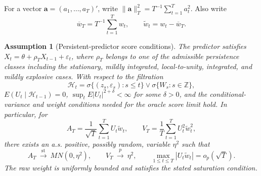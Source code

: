 \documentclass{article}
\newtheorem{assumption}{Assumption}
\begin{document}
For a vector \(\bm a=(a_1,\ldots,a_T)'\), write
\(\|\bm a\|_T^2=T^{-1}\sum_{t=1}^T a_t^2\).  Also write
\[
    \overline w_T=T^{-1}\sum_{t=1}^T w_t,
    \qquad
    \widetilde w_t=w_t-\overline w_T.
\]

\begin{assumption}[Persistent-predictor score conditions]
\label{ass:score-core}
The predictor satisfies
\(X_t=\theta+\rho_T X_{t-1}+\varepsilon_t\), where \(\rho_T\) belongs to
one of the admissible persistence classes
including the stationary, mildly integrated, local-to-unity,
integrated, and mildly explosive cases.  With respect to the filtration
\[
    \mathcal H_t
    =\sigma\{(z_s,\varepsilon_s):s\leq t\}
       \vee\sigma\{W_s:s\in\mathbb Z\},
\]
\(E(U_t\mid\mathcal H_{t-1})=0\),
\(\sup_tE|U_t|^{2+\delta}<\infty\) for some \(\delta>0\), and the
conditional-variance and weight conditions needed for the oracle score limit
hold.  In particular, for
\[
    A_T=\frac1{\sqrt T}\sum_{t=1}^T U_t\widetilde w_t,
    \qquad
    V_T=\frac1T\sum_{t=1}^T U_t^2\widetilde w_t^2,
\]
there exists an a.s. positive, possibly random, variable \(\eta^2\) such that
\begin{equation}
    A_T\ \xrightarrow{\mathrm{st}}\ MN(0,\eta^2),
    \qquad
    V_T\ \xrightarrow{p}\ \eta^2,
    \qquad
    \max_{1\leq t\leq T}|U_t\widetilde w_t|=o_p(\sqrt T).
    \label{eq:score-core}
\end{equation}
The raw weight is uniformly bounded and satisfies the stated saturation
condition.
\end{assumption}
\end{document}
